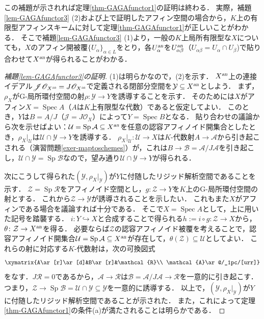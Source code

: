 \documentclass[a4paper,12pt, dvipdfmx]{jsbook}
\def\O{\mathscr{O}}
\def\Spec{\mathop{\mathrm{Spec}}\nolimits}
\def\Sp{\mathop{\mathrm{Sp}}\nolimits}
\def\an{\textsl{an}}
\theoremstyle{plain}
\theoremstyle{definition}
\begin{document}
この補題が示されれば定理\ref{thm-GAGAfunctor1}の証明は終わる．
実際，補題\ref{lem-GAGAfunctor3} (2)および上で証明したアフィン空間の場合から，$K$上の有限型アフィンスキームに対して定理\ref{thm-GAGAfunctor1}が正しいことがわかる．
そこで補題\ref{lem-GAGAfunctor3} (1)より，一般の$K$上局所有限型な$X$についても，$X$のアフィン開被覆$\{U_{\alpha}\}_{\alpha\in L}$をとり，各$U^{\an}_{\alpha}$を$U^{\an}_{\alpha\beta}$（$U_{\alpha\beta}=U_{\alpha}\cap U_{\beta}$)で貼り合わせて$X^{\an}$が得られることがわかる．

\begin{proof}[{\rm 補題\ref{lem-GAGAfunctor3}の証明}]
(1)は明らかなので，(2)を示す．
$X^{\an}$上の連接イデアル$\mathscr{J}\O_{X^{\an}}=J\O_{X^{\an}}$で定義される閉部分空間を$\mathcal{Y}\subseteq X^{\an}$としよう．
まず，$\rho_X$がG-局所環付空間の射$\rho\colon\mathcal{Y}\rightarrow Y$を誘導することを示す．
そのためには$X$がアフィン$X=\Spec A$（$A$は$K$上有限型な代数）であると仮定してよい．
このとき，$Y$は$B=A/J$（$\mathscr{J}=J\O_X$）によって$Y=\Spec B$となる．
貼り合わせの議論から次を示せばよい：$\mathcal{U}=\Sp\mathcal{A}\subseteq X^{\an}$を任意の認容アフィノイド開集合としたとき，$\rho_X|_{\mathcal{U}}$は$\mathcal{U}\cap\mathcal{Y}\rightarrow Y$を誘導する．
$\rho_X|_{\mathcal{U}}\colon\mathcal{U}\rightarrow X$は$K$-代数射$A\rightarrow\mathcal{A}$から引き起こされる（演習問題\ref{exer-maptoschemes}）が，これは$B\rightarrow\mathcal{B}=\mathcal{A}/J\mathcal{A}$を引き起こし，$\mathcal{U}\cap\mathcal{Y}=\Sp\mathcal{B}$なので，望み通り$\mathcal{U}\cap\mathcal{Y}\rightarrow Y$が得られる．

次にこうして得られた$(\mathcal{Y},\rho_X|_{\mathcal{Y}})$が$Y$に付随したリジッド解析空間であることを示す．
$\mathcal{Z}=\Sp\mathcal{R}$をアフィノイド空間とし，$g\colon\mathcal{Z}\rightarrow Y$を$K$上のG-局所環付空間の射とする．
これから$\mathcal{Z}\rightarrow\mathcal{Y}$が誘導されることを示したい．
これもまた$X$がアフィンである場合を議論すれば十分である．
そこで$X=\Spec A$として，上に用いた記号を踏襲する．
$i\colon Y\hookrightarrow X$と合成することで得られる$h:=i\circ g\colon\mathcal{Z}\rightarrow X$から，$\theta\colon\mathcal{Z}\rightarrow X^{\an}$を得る．
必要ならば$\mathcal{Z}$の認容アフィノイド被覆を考えることで，認容アフィノイド開集合$\mathcal{U}=\Sp\mathcal{A}\subseteq X^{\an}$が存在して，$\theta(\mathcal{Z})\subseteq\mathcal{U}$としてよい．
これらの射に対応する$K$-代数射は，次の可換図式
$$
\xymatrix{A\ar[r]\ar[d]&B\ar[r]&\mathcal{R}\\ \mathcal{A}\ar@/_1pc/[urr]}
$$
をなす．$J\mathcal{R}=0$であるから，$\mathcal{A}\rightarrow\mathcal{R}$は$\mathcal{B}=\mathcal{A}/J\mathcal{A}\rightarrow\mathcal{R}$を一意的に引き起こす．
つまり，$\mathcal{Z}\rightarrow\Sp\mathcal{B}=\mathcal{U}\cap\mathcal{Y}\subseteq\mathcal{Y}$を一意的に誘導する．
以上で，$(\mathcal{Y},\rho_X|_{\mathcal{Y}})$が$Y$に付随したリジッド解析空間であることが示された．
また，これによって定理\ref{thm-GAGAfunctor1}の条件(a)が満たされることは明らかである．


\end{proof}
\end{document}
